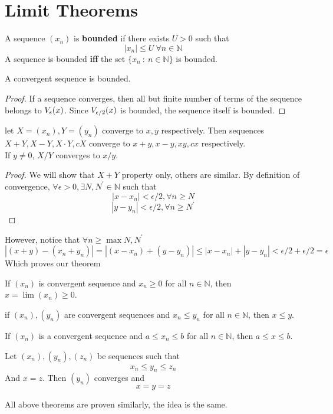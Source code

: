 \section{Limit Theorems}
\begin{definition} A sequence $(x_n)$ is \textbf{bounded} if there exists $U > 0$ such that
    \[ |x_n| \le U \ \forall n \in \mathbb{N}\]
    A sequence is bounded \textbf{iff} the set $\{ x_n \ : \ n \in \mathbb{N}\}$ is bounded.
\end{definition}
\begin{theorem} A convergent sequence is bounded.
    \begin{proof}
        If a sequence converges, then all but finite number of terms of the sequence belongs to $V_{\epsilon}(x)$. Since $V_{\epsilon/2}(x)$ is bounded, the sequence itself is bounded.
    \end{proof}
\end{theorem}
\begin{theorem} let $X= (x_n),Y =(y_n)$ converge to $x,y$ respectively. Then sequences $X+Y,X-Y,X \cdot Y, cX$ converge to $x+y, x-y, xy, cx$ respectively.\\
    If $y \neq 0$, $X/Y$ converges to $x/y$. \\
    \begin{proof}
        We will show that $X+Y$ property only, others are similar.
        By definition of convergence, $\forall \epsilon > 0, \exists N,N^{'} \in \mathbb{N}$ such that 
        \[|x - x_n| < \epsilon /2, \forall n \ge N\]
        \[|y - y_n| < \epsilon / 2, \forall n \ge N^{'}\]
    \end{proof}
    However, notice that $\forall n \ge \max N,N^{'}$
    \[|(x+y) - (x_n+y_n)| = |(x - x_n)+ (y-y_n)| \le |x - x_n| + |y- y_n| < \epsilon/2 + \epsilon/2 = \epsilon\]
    Which proves our theorem
\end{theorem}

\begin{theorem}
    If $(x_n)$ is convergent sequence and $x_n \ge 0$ for all $n \in \mathbb{N}$, then $x = \lim(x_n) \ge 0$.
\end{theorem}
\begin{theorem}
    if $(x_n),(y_n)$ are convergent sequences and $x_n \le y_n$ for all $n \in \mathbb{N}$, then $x \le y$.
\end{theorem}
\begin{theorem}
If $(x_n)$ is a convergent sequence and $a \le x_n \le b$ for all $n \in \mathbb{N}$, then $a \le x \le b$.
\end{theorem}
\begin{theorem}
    Let $(x_n),(y_n),(z_n)$ be sequences such that
    \[ x_n \le y_n \le z_n\]
    And $x = z$. Then $(y_n)$ converges and
    \[ x = y = z\]
\end{theorem}
All above theorems are proven similarly, the idea is the same.

